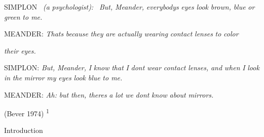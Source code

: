\begin{styleStandard}
SIMPLON \ \textit{(a}\textit{ }\textit{psychologist): }\textit{\ }\textit{But,}\textit{ }\textit{Meander,}\textit{ }\textit{everybody{\textquotesingle}s}\textit{ }\textit{eyes}\textit{ }\textit{look}\textit{ }\textit{brown,}\textit{ }\textit{blue}\textit{ }\textit{or}\textit{ }\textit{green}\textit{ }\textit{to me.}
\end{styleStandard}


\begin{styleStandard}
MEANDER: \textit{That{\textquotesingle}s}\textit{ }\textit{because}\textit{ }\textit{they}\textit{ }\textit{are}\textit{ }\textit{actually}\textit{ }\textit{wearing}\textit{ }\textit{contact}\textit{ }\textit{lenses}\textit{ }\textit{to}\textit{ }\textit{color}
\end{styleStandard}


\begin{styleStandard}
\textit{their}\textit{ }\textit{eyes.}
\end{styleStandard}


\begin{styleStandard}
SIMPLON: \textit{But,}\textit{ }\textit{Meander,}\textit{ }\textit{I}\textit{ }\textit{know}\textit{ }\textit{that}\textit{ }\textit{I}\textit{ }\textit{don{\textquotesingle}t}\textit{ }\textit{wear}\textit{ }\textit{contact}\textit{ }\textit{lenses,}\textit{ }\textit{and}\textit{ }\textit{when}\textit{ }\textit{I}\textit{ }\textit{look}\textit{ }\textit{in}\textit{ }\textit{the}\textit{ }\textit{mirror}\textit{ }\textit{my}\textit{ }\textit{eyes}\textit{ }\textit{look}\textit{ }\textit{blue}\textit{ }\textit{to me.}
\end{styleStandard}


\begin{styleStandard}
MEANDER: \textit{Ah:}\textit{ }\textit{but}\textit{ }\textit{then,}\textit{ }\textit{there{\textquotesingle}s}\textit{ }\textit{a}\textit{ }\textit{lot}\textit{ }\textit{we}\textit{ }\textit{don{\textquotesingle}t}\textit{ }\textit{know}\textit{ }\textit{about}\textit{ }\textit{mirrors.}
\end{styleStandard}


\begin{styleStandard}
(Bever 1974) \textsuperscript{1}
\end{styleStandard}


\begin{styleHeadingvii}
Introduction
\end{styleHeadingvii}


